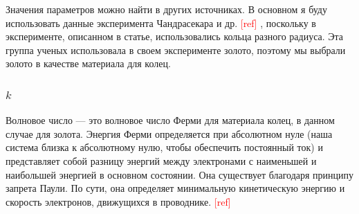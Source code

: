 \documentclass[A4,12pt,oneside]{article}
\renewcommand{\(}{\left(}
\renewcommand{\)}{\right)}
\newcommand{\citeph}{\textcolor{red}{[ref] }}
\begin{document}
Значения параметров можно найти в других источниках. В основном я буду использовать данные эксперимента Чандрасекара и др. \citeph, поскольку в эксперименте, описанном в статье, использовались кольца разного радиуса. Эта группа ученых использовала в своем эксперименте золото, поэтому мы выбрали золото в качестве материала для колец.

\subsubsection{$k$}

Волновое число — это волновое число Ферми для материала колец, в данном случае для золота. Энергия Ферми определяется при абсолютном нуле (наша система близка к абсолютному нулю, чтобы обеспечить постоянный ток) и представляет собой разницу энергий между электронами с наименьшей и наибольшей энергией в основном состоянии. Она существует благодаря принципу запрета Паули. По сути, она определяет минимальную кинетическую энергию и скорость электронов, движущихся в проводнике. \citeph
\end{document}
